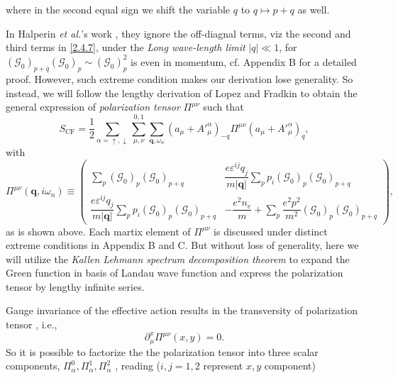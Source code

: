 \documentclass[bachelor,english,numbers]{ustcthesis}
\begin{document}
		where in the second equal sign we shift the variable $q$ to $q\mapsto p+q$ as well.\par
		In Halperin {\it et al.}'s work \cite{Halperin1995Theory}, they ignore the off-diagnal terms, viz the second and third terms in \eqref{2.4.7}, under the \emph{Long wave-length limit} $|q|\ll1$, for $(\mathcal{G}_0)_{p+q}(\mathcal{G}_0)_p\sim(\mathcal{G}_0)_p^2$ is even in momentum, cf. Appendix B for a detailed proof. However, such extreme condition makes our derivation lose generality. So instead, we will follow the lengthy derivation of Lopez and Fradkin to obtain the general expression of \emph{polarization tensor} $\Pi^{\mu \nu}$ such that
		\begin{equation}\label{2.4.6}
			S_{\text{CF}}=\dfrac{1}{2}\sum_{\alpha=\uparrow,\downarrow}\sum_{\mu,\nu}^{0,1}\sum_{\bm{q},\omega_n}\left(a_\mu+{A'}_\mu^\alpha\right)_{-q}\Pi^{\mu\nu}\left(a_\mu+{A'}_\mu^\alpha\right)_{q},
		\end{equation}
		with
		\begin{equation}\label{2.4.7}
			\Pi^{\mu\nu}(\bm{q},i\omega_n)\equiv \left(\begin{array}{cc}
				\displaystyle\sum_p(\mathcal{G}_0)_p(\mathcal{G}_0)_{p+q} & \displaystyle\dfrac{e \varepsilon^{ij} q_j}{m|\bm{q}|}\sum_{p}p_i(\mathcal{G}_0)_p(\mathcal{G}_0)_{p+q}\\
				\displaystyle\dfrac{e \varepsilon^{ij} q_j}{m|\bm{q}|}\sum_{p}p_i(\mathcal{G}_0)_p(\mathcal{G}_0)_{p+q} & \displaystyle-\dfrac{e^2n_e}{m}+\sum_p\dfrac{e^2p^2}{m^2}(\mathcal{G}_0)_p(\mathcal{G}_0)_{p+q}
			\end{array}\right),
		\end{equation}
		as is shown above. Each martix element of $\Pi^{\mu \nu}$ is discussed under distinct extreme conditions in Appendix B and C. But without loss of generality, here we will utilize the \emph{Kallen Lehmann spectrum decomposition theorem} \cite{abrikosov2012methods,peskin1995introduction} to expand the Green function in basis of Landau wave function and express the polarization tensor by lengthy infinite series.\par
		Gauge invariance of the effective action results in the transversity of polarization tensor \cite{Fradkin2013Field}, i.e.,
		\begin{equation}\label{2.4.8}
			\partial_\mu^x\Pi^{\mu\nu}(x,y)=0.
		\end{equation}
		So it is possible to factorize the the polarization tensor into three scalar components, $\Pi^0_\alpha, \Pi^1_\alpha, \Pi^2_\alpha$ \cite{lopez1991fractional,lopez1995fermionic}, reading ($i,j=1,2$ represent $x,y$ component)
\end{document}
